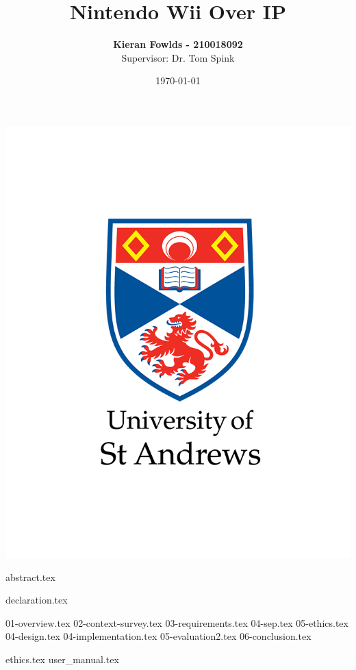 \documentclass[12pt,abstract=true,headings=standardclasses,titlepage=false]{scrreprt}
\title{Nintendo Wii Over IP}
\author{\textbf{Kieran Fowlds - 210018092} \\
Supervisor: Dr. Tom Spink}
\date{\today}
\begin{document}
\maketitle
\thispagestyle{empty}
\vfill
\begin{center}
	\includegraphics[width=0.6\linewidth]{figures/logo.png}
\end{center}

\newpage
{abstract.tex}
\thispagestyle{empty}
\clearpage


\newpage
{declaration.tex}
\thispagestyle{empty}
\clearpage

\newpage
\setcounter{page}{1}

\tableofcontents
\clearpage
{}
\setcounter{page}{1}

{01-overview.tex}
{02-context-survey.tex}
{03-requirements.tex}
{04-sep.tex}
{05-ethics.tex}
{04-design.tex}
{04-implementation.tex}
{05-evaluation2.tex}
{06-conclusion.tex}

\printbibliography[title=References]

\appendix
\clearpage
\renewcommand{\thepage}{}
{ethics.tex}
\setcounter{chapter}{1}
{user_manual.tex}
\end{document}

